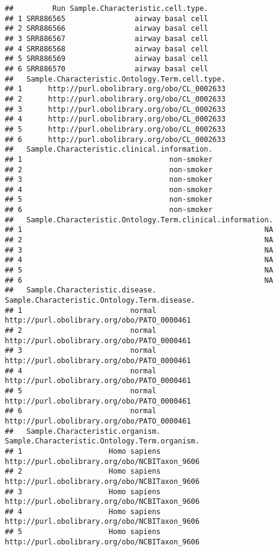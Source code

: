 \documentclass[
]{article}
\begin{document}
\begin{verbatim}
##         Run Sample.Characteristic.cell.type.
## 1 SRR886565                airway basal cell
## 2 SRR886566                airway basal cell
## 3 SRR886567                airway basal cell
## 4 SRR886568                airway basal cell
## 5 SRR886569                airway basal cell
## 6 SRR886570                airway basal cell
##   Sample.Characteristic.Ontology.Term.cell.type.
## 1      http://purl.obolibrary.org/obo/CL_0002633
## 2      http://purl.obolibrary.org/obo/CL_0002633
## 3      http://purl.obolibrary.org/obo/CL_0002633
## 4      http://purl.obolibrary.org/obo/CL_0002633
## 5      http://purl.obolibrary.org/obo/CL_0002633
## 6      http://purl.obolibrary.org/obo/CL_0002633
##   Sample.Characteristic.clinical.information.
## 1                                  non-smoker
## 2                                  non-smoker
## 3                                  non-smoker
## 4                                  non-smoker
## 5                                  non-smoker
## 6                                  non-smoker
##   Sample.Characteristic.Ontology.Term.clinical.information.
## 1                                                        NA
## 2                                                        NA
## 3                                                        NA
## 4                                                        NA
## 5                                                        NA
## 6                                                        NA
##   Sample.Characteristic.disease. Sample.Characteristic.Ontology.Term.disease.
## 1                         normal  http://purl.obolibrary.org/obo/PATO_0000461
## 2                         normal  http://purl.obolibrary.org/obo/PATO_0000461
## 3                         normal  http://purl.obolibrary.org/obo/PATO_0000461
## 4                         normal  http://purl.obolibrary.org/obo/PATO_0000461
## 5                         normal  http://purl.obolibrary.org/obo/PATO_0000461
## 6                         normal  http://purl.obolibrary.org/obo/PATO_0000461
##   Sample.Characteristic.organism. Sample.Characteristic.Ontology.Term.organism.
## 1                    Homo sapiens http://purl.obolibrary.org/obo/NCBITaxon_9606
## 2                    Homo sapiens http://purl.obolibrary.org/obo/NCBITaxon_9606
## 3                    Homo sapiens http://purl.obolibrary.org/obo/NCBITaxon_9606
## 4                    Homo sapiens http://purl.obolibrary.org/obo/NCBITaxon_9606
## 5                    Homo sapiens http://purl.obolibrary.org/obo/NCBITaxon_9606

\end{verbatim}
\end{document}
